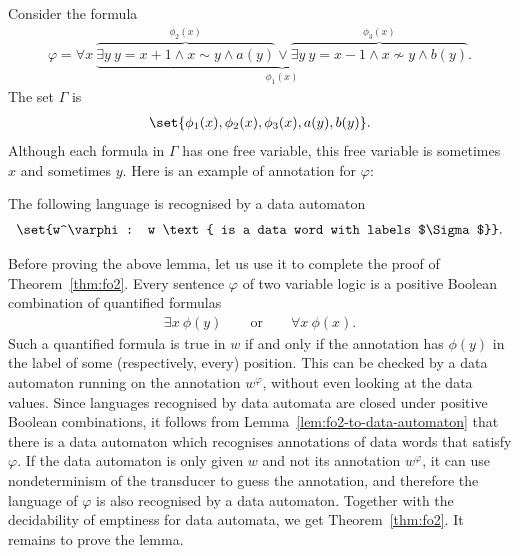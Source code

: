 \begin{myexample}
Consider the formula
\begin{align*}
	\varphi = \forall x \ \underbrace{\overbrace{\exists y\ y = x+1 \land x \sim y \land a(y)}^{\phi_2(x)} \lor \overbrace{\exists y\ y = x-1 \land x \not\sim y \land b(y)}^{\phi_3(x)}
	}_{\phi_1(x)}.
\end{align*}
The set $\Gamma$ is 
\begin{align*}
	\set{\phi_1(x),\phi_2(x),\phi_3(x), a(y), b(y)}.
\end{align*}
Although each formula in $\Gamma$ has one free variable, this free variable is sometimes $x$ and sometimes $y$. Here is an example of annotation for $\varphi$: 
\end{myexample}

\begin{lemma}\label{lem:fo2-to-data-automaton}
	The following language is recognised by a data automaton
	\begin{align*}
		\set{w^\varphi : w \text{ is a data word with labels $\Sigma$}}.
	\end{align*}
\end{lemma}

Before proving the above lemma, let us use it to complete the proof of Theorem~\ref{thm:fo2}. Every sentence $\varphi$ of two variable logic is a positive Boolean combination of quantified formulas
\begin{align*}
	 \exists x\ \phi(y) \qquad \text{or} \qquad \forall x \ \phi(x).
\end{align*}
Such a quantified formula is true in $w$ if and only if the annotation has $\phi(y)$ in the label of some (respectively, every) position. This can be checked by a data automaton running on the annotation $w^\varphi$, without even looking at the data values. Since languages recognised by data automata are closed under positive Boolean combinations, it follows from Lemma~\ref{lem:fo2-to-data-automaton} that there is a data automaton which recognises annotations of data words that satisfy $\varphi$. If the data automaton is only given $w$ and not its annotation $w^\varphi$, it can use nondeterminism of the transducer to guess the annotation, and therefore the language of $\varphi$ is also recognised by a data automaton. Together with the decidability of emptiness for data automata, we get Theorem~\ref{thm:fo2}. It remains to prove the lemma.


